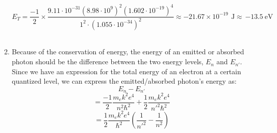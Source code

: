 \documentclass{article}
\begin{document}
\begin{enumerate}[label=\alph*)]
\[E_T = \frac{-1}{2}\times{\frac{9.11\cdot10^{-31}(8.98\cdot10^9)^2(1.602\cdot10^{-19})^4}{1^2\cdot(1.055\cdot10^{-34})^2}} \approx -21.67\times10^{-19}\,\SI{}{\joule}\approx\,\SI{-13.5}{\electronvolt}\]
\\
\item
Because of the conservation of energy, the energy of an emitted or absorbed photon should be the difference between the two energy levels, $E_n$ and $E_{n'}$. Since we have an expression for the total energy of an electron at a certain quantized level, we can express the emitted/absorbed photon's energy as:
\[E_n - E_{n'}\]
\[=\frac{-1}{2}\frac{m_ek^2e^4}{n^2\hbar^2} + \frac{1}{2}\frac{m_ek^2e^4}{{n'}^2\hbar^2}\]
\[=\frac{1}{2}\frac{m_ek^2e^4}{\hbar^2}(\frac{1}{{n'}^2} - \frac{1}{{n}^2})\]
\end{enumerate}
\end{document}
